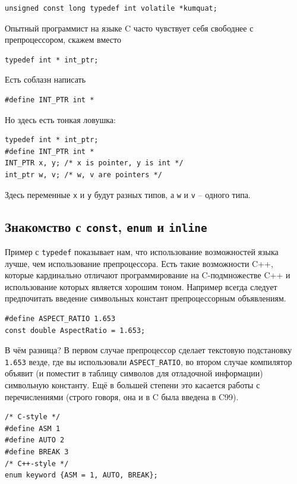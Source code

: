 \documentclass[a4paper,12pt,oneside]{article}
\begin{document}
\begin{lstlisting}
unsigned const long typedef int volatile *kumquat;
\end{lstlisting}

Опытный программист на языке C часто чувствует себя свободнее с препроцессором, скажем вместо

\begin{lstlisting}
typedef int * int_ptr;
\end{lstlisting}

Есть соблазн написать

\begin{lstlisting}
#define INT_PTR int *
\end{lstlisting}

Но здесь есть тонкая ловушка:

\begin{lstlisting}
typedef int * int_ptr;
#define INT_PTR int *
INT_PTR x, y; /* x is pointer, y is int */
int_ptr w, v; /* w, v are pointers */
\end{lstlisting}

Здесь переменные \lstinline!x! и \lstinline!y! будут разных типов, а \lstinline!w! и \lstinline!v! – одного типа.

\subsection{Знакомство с \lstinline!const!, \lstinline!enum! и \lstinline!inline!}

Пример с \lstinline!typedef! показывает нам, что использование возможностей языка лучше, чем использование препроцессора. Есть такие возможности C++, которые кардинально отличают программирование на C-подмножестве C++ и использование которых является хорошим тоном. Например всегда следует предпочитать введение символьных констант препроцессорным объявлениям.

\begin{lstlisting}
#define ASPECT_RATIO 1.653
const double AspectRatio = 1.653; 
\end{lstlisting}

В чём разница? В первом случае препроцессор сделает текстовую подстановку \lstinline!1.653! везде, где вы использовали \lstinline!ASPECT_RATIO!, во втором случае компилятор объявит (и поместит в таблицу символов для отладочной информации) символьную константу. Ещё в большей степени это касается работы с перечислениями (строго говоря, она и в C была введена в C99).

\begin{lstlisting}
/* C-style */
#define ASM 1
#define AUTO 2
#define BREAK 3
/* C++-style */
enum keyword {ASM = 1, AUTO, BREAK};
\end{lstlisting}
\end{document}
